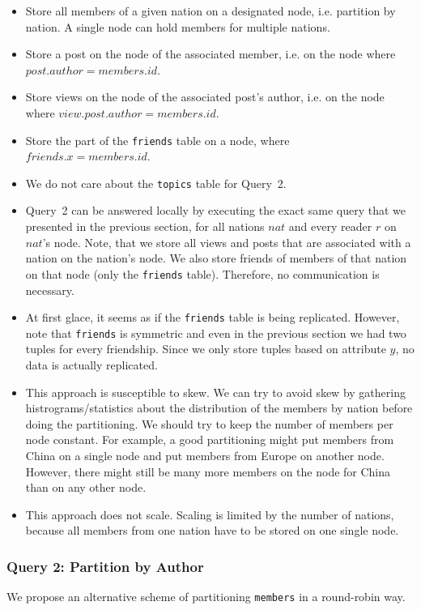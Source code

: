 \documentclass[12pt]{article}
\begin{document}
\begin{itemize}
 	\item Store all members of a given nation on a designated node, i.e. partition by nation. A single node can hold members for multiple nations.
    \item Store a post on the node of the associated member, i.e. on the node where $\mathit{post.author} = \mathit{members.id}$.
    \item Store views on the node of the associated post's author, i.e. on the node where $\mathit{view.post.author} = \mathit{members.id}$.
    \item Store the part of the \lstinline{friends} table on a node, where $\mathit{friends.x} = \mathit{members.id}$.
    \item We do not care about the \lstinline{topics} table for Query~2.
    \item Query~2 can be answered locally by executing the exact same query that we presented in the previous section, for all nations $\mathit{nat}$ and every reader $r$ on $\mathit{nat}$'s node. Note, that we store all views and posts that are associated with a nation on the nation's node. We also store friends of members of that nation on that node (only the \lstinline{friends} table). Therefore, no communication is necessary.
    \item At first glace, it seems as if the \lstinline{friends} table is being replicated. However, note that \lstinline{friends} is symmetric and even in the previous section we had two tuples for every friendship. Since we only store tuples based on attribute $y$, no data is actually replicated.
    \item This approach is susceptible to skew. We can try to avoid skew by gathering histrograms/statistics about the distribution of the members by nation before doing the partitioning. We should try to keep the number of members per node constant. For example, a good partitioning might put members from China on a single node and put members from Europe on another node. However, there might still be many more members on the node for China than on any other node.
    \item This approach does not scale. Scaling is limited by the number of nations, because all members from one nation have to be stored on one single node.
\end{itemize}

\subsubsection{Query 2: Partition by Author}
We propose an alternative scheme of partitioning \lstinline{members} in a round-robin way.
\end{document}
